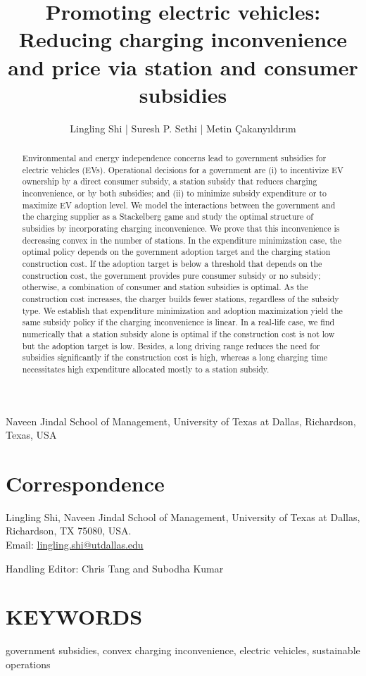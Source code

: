\documentclass[10pt]{article}
\title{Promoting electric vehicles: Reducing charging inconvenience and price via station and consumer subsidies }
\author{Lingling Shi | Suresh P. Sethi | Metin Çakanyıldırım}
\date{}
\begin{document}
\maketitle
Naveen Jindal School of Management, University of Texas at Dallas, Richardson, Texas, USA

\section*{Correspondence}
Lingling Shi, Naveen Jindal School of Management, University of Texas at Dallas, Richardson, TX 75080, USA.\\
Email: \href{mailto:lingling.shi@utdallas.edu}{lingling.shi@utdallas.edu}

Handling Editor: Chris Tang and Subodha Kumar

\begin{abstract}
Environmental and energy independence concerns lead to government subsidies for electric vehicles (EVs). Operational decisions for a government are (i) to incentivize EV ownership by a direct consumer subsidy, a station subsidy that reduces charging inconvenience, or by both subsidies; and (ii) to minimize subsidy expenditure or to maximize EV adoption level. We model the interactions between the government and the charging supplier as a Stackelberg game and study the optimal structure of subsidies by incorporating charging inconvenience. We prove that this inconvenience is decreasing convex in the number of stations. In the expenditure minimization case, the optimal policy depends on the government adoption target and the charging station construction cost. If the adoption target is below a threshold that depends on the construction cost, the government provides pure consumer subsidy or no subsidy; otherwise, a combination of consumer and station subsidies is optimal. As the construction cost increases, the charger builds fewer stations, regardless of the subsidy type. We establish that expenditure minimization and adoption maximization yield the same subsidy policy if the charging inconvenience is linear. In a real-life case, we find numerically that a station subsidy alone is optimal if the construction cost is not low but the adoption target is low. Besides, a long driving range reduces the need for subsidies significantly if the construction cost is high, whereas a long charging time necessitates high expenditure allocated mostly to a station subsidy.
\end{abstract}

\section*{KEYWORDS}
government subsidies, convex charging inconvenience, electric vehicles, sustainable operations
\end{document}
